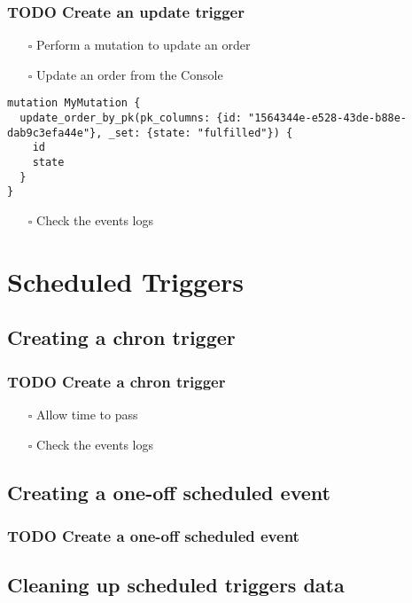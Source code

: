 \documentclass[11pt]{article}
\begin{document}
\subsubsection{{\bfseries\sffamily TODO} Create an update trigger}
\label{sec:org7846a26}
\begin{itemize}
\item[{$\square$}] Perform a mutation to update an order
\item[{$\square$}] Update an order from the Console
\end{itemize}
\begin{verbatim}
mutation MyMutation {
  update_order_by_pk(pk_columns: {id: "1564344e-e528-43de-b88e-dab9c3efa44e"}, _set: {state: "fulfilled"}) {
    id
    state
  }
}
\end{verbatim}
\begin{itemize}
\item[{$\square$}] Check the events logs
\end{itemize}
\section{Scheduled Triggers}
\label{sec:org2d7fea5}
\subsection{Creating a chron trigger}
\label{sec:orgb50c382}
\subsubsection{{\bfseries\sffamily TODO} Create a chron trigger}
\label{sec:org0c32813}
\begin{itemize}
\item[{$\square$}] Allow time to pass
\item[{$\square$}] Check the events logs
\end{itemize}
\subsection{Creating a one-off scheduled event}
\label{sec:org5ea96e5}
\subsubsection{{\bfseries\sffamily TODO} Create a one-off scheduled event}
\label{sec:org928aeb3}
\subsection{Cleaning up scheduled triggers data}
\label{sec:orgb350def}
\end{document}
